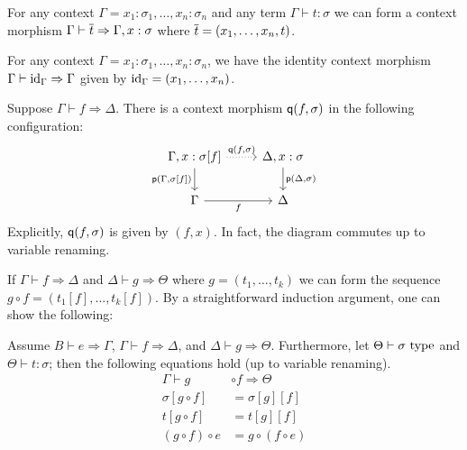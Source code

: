 \documentclass[a4paper]{article}
\begin{document}
\begin{example}\label{eg:bar}
  For any context $\Gamma = x_1 : \sigma_1,\ldots,x_n : \sigma_n$ and any term $\Gamma \vdash t : \sigma$ we can form a context morphism $\Gamma \vdash \overline{t} \Rightarrow \Gamma, x : \sigma$ where $\overline{t} = (x_1,\ldots,x_n,t)$.
\end{example}

\begin{example}
  For any context $\Gamma = x_1 : \sigma_1,\ldots,x_n : \sigma_n$, we have the identity context morphism $\Gamma \vdash \mathrm{id}_{\Gamma} \Rightarrow \Gamma$ given by $\mathrm{id}_{\Gamma} = (x_1,\ldots,x_n)$.
\end{example}

\begin{example}
  Suppose $\Gamma \vdash f \Rightarrow \Delta$.
  There is a context morphism $\operatorname{\mathsf{q}}(f,\sigma)$ in the following configuration:
  \[\begin{tikzcd}
      {\Gamma,x:\sigma[f]} & {\Delta,x:\sigma} \\
      \Gamma & \Delta
      \arrow["{\ctxWkn(f,\sigma)}", dotted, from=1-1, to=1-2]
      \arrow["{\ctxExt(\Gamma,\sigma[f])}"', from=1-1, to=2-1]
      \arrow["{\ctxExt(\Delta,\sigma)}", from=1-2, to=2-2]
      \arrow["f"', from=2-1, to=2-2]
    \end{tikzcd}\]
  Explicitly, $\operatorname{\mathsf{q}}(f,\sigma)$ is given by $(f, x)$.
  In fact, the diagram commutes up to variable renaming.
\end{example}

If $\Gamma \vdash f \Rightarrow \Delta$ and $\Delta \vdash g \Rightarrow \Theta$ where $g = (t_1,\ldots,t_k)$ we can form the sequence $g \circ f = (t_1[f],\ldots,t_k[f])$.
By a straightforward induction argument, one can show the following:

\begin{proposition}
  Assume $B \vdash e \Rightarrow \Gamma$, $\Gamma \vdash f \Rightarrow \Delta$, and $\Delta \vdash g \Rightarrow \Theta$.
  Furthermore, let $\Theta \vdash \sigma~\mathrm{type}$ and $\Theta \vdash t : \sigma$; then the following equations hold (up to variable renaming).
  \begin{align*}
    \Gamma \vdash g &\circ f \Rightarrow \Theta\\
    \sigma[g \circ f] &= \sigma[g][f]\\
    t[g \circ f] &= t[g][f]\\
    (g \circ f) \circ e &= g \circ (f \circ e)
  \end{align*}
\end{proposition}
\end{document}
